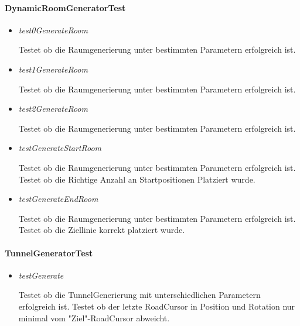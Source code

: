 \paragraph{DynamicRoomGeneratorTest}
\begin{itemize}
	\item \textit{test0GenerateRoom}
        \begin{leftbar}[0.9\linewidth]
            Testet ob die Raumgenerierung unter bestimmten Parametern erfolgreich ist.
		\end{leftbar}
	\item \textit{test1GenerateRoom}
        \begin{leftbar}[0.9\linewidth]
            Testet ob die Raumgenerierung unter bestimmten Parametern erfolgreich ist.
		\end{leftbar}
	\item \textit{test2GenerateRoom}
        \begin{leftbar}[0.9\linewidth]
            Testet ob die Raumgenerierung unter bestimmten Parametern erfolgreich ist.
		\end{leftbar}
	\item \textit{testGenerateStartRoom}
        \begin{leftbar}[0.9\linewidth]
			Testet ob die Raumgenerierung unter bestimmten Parametern erfolgreich ist.
			Testet ob die Richtige Anzahl an Startpositionen Platziert wurde.
		\end{leftbar}
	\item \textit{testGenerateEndRoom}
        \begin{leftbar}[0.9\linewidth]
			Testet ob die Raumgenerierung unter bestimmten Parametern erfolgreich ist.
			Testet ob die Ziellinie korrekt platziert wurde.
		\end{leftbar}
\end{itemize}


\paragraph{TunnelGeneratorTest}
\begin{itemize}
	\item \textit{testGenerate}
        \begin{leftbar}[0.9\linewidth]
			Testet ob die TunnelGenerierung mit unterschiedlichen Parametern erfolgreich ist.
			Testet ob der letzte RoadCursor in Position und Rotation nur minimal vom "Ziel"-RoadCursor abweicht.
		\end{leftbar}
\end{itemize}


